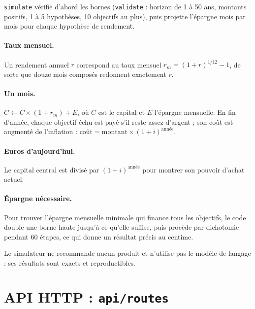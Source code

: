 \documentclass[11pt,a4paper]{article}
\newcommand{\fichier}[1]{\texttt{#1}}
\begin{document}
\texttt{simulate} vérifie d'abord les bornes (\texttt{validate} : horizon de 1 à 50 ans, montants positifs, 1 à 5 hypothèses, 10 objectifs au plus), puis projette l'épargne mois par mois pour chaque hypothèse de rendement.

\paragraph{Taux mensuel.} Un rendement annuel \(r\) correspond au taux mensuel \(r_m = (1 + r)^{1/12} - 1\), de sorte que douze mois composés redonnent exactement \(r\).

\paragraph{Un mois.} \(C \leftarrow C \times (1 + r_m) + E\), où \(C\) est le capital et \(E\) l'épargne mensuelle. En fin d'année, chaque objectif échu est payé s'il reste assez d'argent ; son coût est augmenté de l'inflation : \(\text{coût} = \text{montant} \times (1 + i)^{\text{année}}\).



\paragraph{Euros d'aujourd'hui.} Le capital central est divisé par \((1+i)^{\text{année}}\) pour montrer son pouvoir d'achat actuel.

\paragraph{Épargne nécessaire.} Pour trouver l'épargne mensuelle minimale qui finance tous les objectifs, le code double une borne haute jusqu'à ce qu'elle suffise, puis procède par dichotomie pendant 60 étapes, ce qui donne un résultat précis au centime.



Le simulateur ne recommande aucun produit et n'utilise pas le modèle de langage : ses résultats sont exacts et reproductibles.

\section{API HTTP : \texttt{api/routes}}
\end{document}
